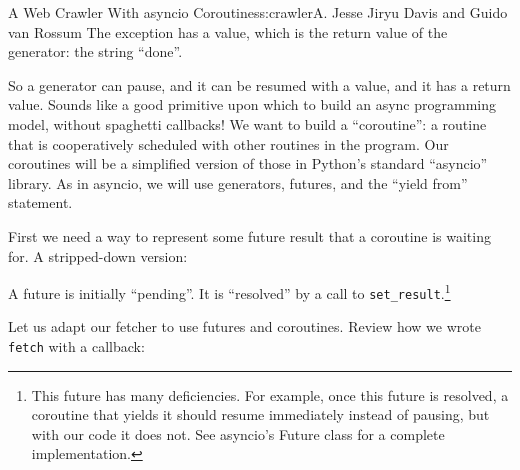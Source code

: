 \begin{aosachapter}{A Web Crawler With asyncio Coroutines}{s:crawler}{A. Jesse Jiryu Davis and Guido van Rossum}
The exception has a value, which is the return value of the generator:
the string ``done''.

\label{building-coroutines-with-generators}

So a generator can pause, and it can be resumed with a value, and it has
a return value. Sounds like a good primitive upon which to build an
async programming model, without spaghetti callbacks! We want to build a
``coroutine'': a routine that is cooperatively scheduled with other
routines in the program. Our coroutines will be a simplified version of
those in Python's standard ``asyncio'' library. As in asyncio, we will
use generators, futures, and the ``yield from'' statement.

First we need a way to represent some future result that a coroutine is
waiting for. A stripped-down version:

\begin{Shaded}
\begin{Highlighting}[]
 
     \NormalTok{(}\NormalTok{):}

     

     
         
            \NormalTok{)}
\end{Highlighting}
\end{Shaded}

A future is initially ``pending''. It is ``resolved'' by a call to
\texttt{set\_result}.\footnote{This future has many deficiencies. For
  example, once this future is resolved, a coroutine that yields it
  should resume immediately instead of pausing, but with our code it
  does not. See asyncio's Future class for a complete implementation.}

Let us adapt our fetcher to use futures and coroutines. Review how we
wrote \texttt{fetch} with a callback:


\end{aosachapter}
